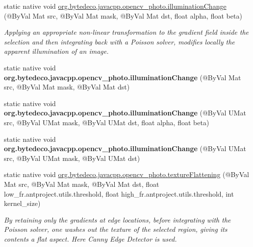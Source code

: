 \begin{DoxyCompactItemize}
static native void \hyperlink{group__photo__clone_gab7df287c3db8bb77269a05cb1e758591}{org.\+bytedeco.\+javacpp.\+opencv\+\_\+photo.\+illumination\+Change} (@By\+Val Mat src, @By\+Val Mat mask, @By\+Val Mat dst, float alpha, float beta)
\begin{DoxyCompactList}\small\item\em Applying an appropriate non-\/linear transformation to the gradient field inside the selection and then integrating back with a Poisson solver, modifies locally the apparent illumination of an image. \end{DoxyCompactList}\item 
\mbox{\label{group__photo__clone_gab3e52ed0c9f389ac9a17955a2cbff3b6}} 
static native void {\bfseries org.\+bytedeco.\+javacpp.\+opencv\+\_\+photo.\+illumination\+Change} (@By\+Val Mat src, @By\+Val Mat mask, @By\+Val Mat dst)
\item 
\mbox{\label{group__photo__clone_ga09b1569af074d9111f0b13c03da3f5dd}} 
static native void {\bfseries org.\+bytedeco.\+javacpp.\+opencv\+\_\+photo.\+illumination\+Change} (@By\+Val U\+Mat src, @By\+Val U\+Mat mask, @By\+Val U\+Mat dst, float alpha, float beta)
\item 
\mbox{\label{group__photo__clone_ga3923642ffb0eae09d7d9926c8b91dbed}} 
static native void {\bfseries org.\+bytedeco.\+javacpp.\+opencv\+\_\+photo.\+illumination\+Change} (@By\+Val U\+Mat src, @By\+Val U\+Mat mask, @By\+Val U\+Mat dst)
\item 
static native void \hyperlink{group__photo__clone_ga8d42433222e7742e59e275e148c3d4a5}{org.\+bytedeco.\+javacpp.\+opencv\+\_\+photo.\+texture\+Flattening} (@By\+Val Mat src, @By\+Val Mat mask, @By\+Val Mat dst, float low\+\_\+fr.antproject.utils.threshold, float high\+\_\+fr.antproject.utils.threshold, int kernel\+\_\+size)
\begin{DoxyCompactList}\small\item\em By retaining only the gradients at edge locations, before integrating with the Poisson solver, one washes out the texture of the selected region, giving its contents a flat aspect. Here Canny Edge Detector is used. \end{DoxyCompactList}\item 
\mbox{\label{group__photo__clone_gac122bd4168012e6d0c3fc44d3fa71811}} 

\end{DoxyCompactItemize}

